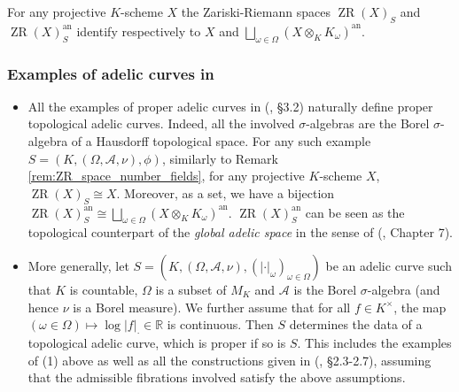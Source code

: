 \documentclass [11pt,reqno]{amsart}
\def\bR{{\mathbb{R}}}
\newcommand{\1}{\mathmybb{1}}
\def\cA{{\mathcal{A}}}
\def\an{\operatorname{an}}
\def\ZR{\operatorname{ZR}}
\begin{document}
\begin{remark}
\label{rem:ZR_space_number_fields}
For any projective $K$-scheme $X$ the Zariski-Riemann spaces $\ZR(X)_{S}$ and $\ZR(X)^{\an}_{S}$ identify respectively to $X$ and $\bigsqcup_{\omega\in\Omega} (X\otimes_{K}K_{\omega})^{\an}$.
\end{remark}

\subsubsection{Examples of adelic curves in \cite{ChenMori,ChenMori21}}
\label{subsub:examples_tac_adelic_curves}

\begin{itemize}
	\item[(1)] All the examples of proper adelic curves in (\cite{ChenMori}, \S 3.2) naturally define proper topological adelic curves. Indeed, all the involved $\sigma$-algebras are the Borel $\sigma$-algebra of a Hausdorff topological space. For any such example $S=(K,(\Omega,\cA,\nu),\phi)$, similarly to Remark \ref{rem:ZR_space_number_fields}, for any projective $K$-scheme $X$, $\ZR(X)_{S} \cong X$. Moreover, as a set, we have a bijection $\ZR(X)^{\an}_{S}\cong\bigsqcup_{\omega\in\Omega} (X\otimes_{K}K_{\omega})^{\an}$. $\ZR(X)^{\an}_{S}$ can be seen as the topological counterpart of the \emph{global adelic space} in the sense of (\cite{ChenMori24}, Chapter 7).
	\item[(2)] More generally, let $S=(K,(\Omega,\cA,\nu),(|\cdot|_{\omega})_{\omega\in\Omega})$ be an adelic curve such that $K$ is countable, $\Omega$ is a subset of $M_{K}$ and $\cA$ is the Borel $\sigma$-algebra (and hence $\nu$ is a Borel measure). We further assume that for all $f\in K^{\times}$, the map $(\omega\in\Omega)\mapsto\log|f|_{\cdot}\in \bR$ is continuous. Then $S$ determines the data of a topological adelic curve, which is proper if so is $S$. This includes the examples of (1) above as well as all the constructions given in (\cite{ChenMori21}, \S 2.3-2.7), assuming that the admissible fibrations involved satisfy the above assumptions. 

\end{itemize}
\end{document}
